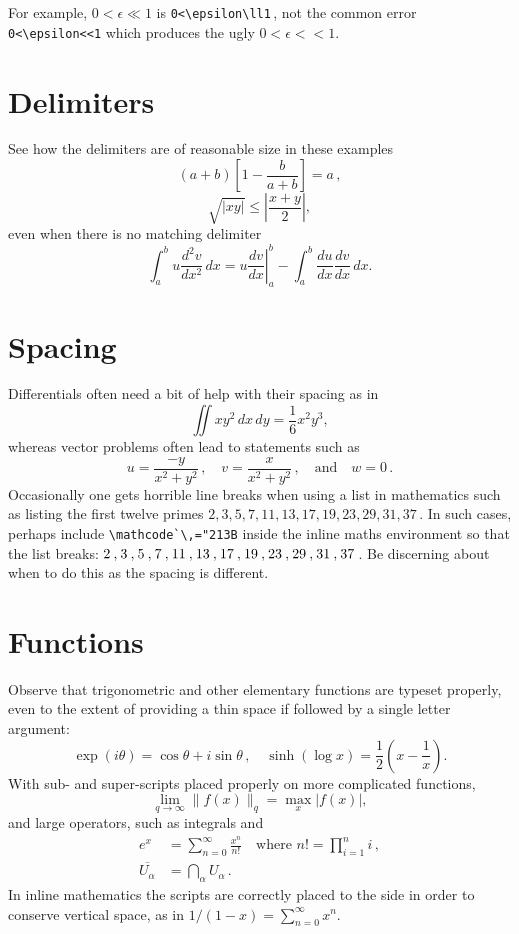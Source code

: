 \documentclass[20pt,a4paper]{extarticle}
\begin{document}
For example, \(0<\epsilon\ll1\) is
\verb|0<\epsilon\ll1|\,, not the common error 
\verb|0<\epsilon<<1| which produces the ugly
\(0<\epsilon<<1\).






\section{Delimiters}

See how the delimiters are of reasonable size in these examples
\[
	\left(a+b\right)\left[1-\frac{b}{a+b}\right]=a\,,
\]
\[
	\sqrt{|xy|}\leq\left|\frac{x+y}{2}\right|,
\]
even when there is no matching delimiter
\[
	\int_a^bu\frac{d^2v}{dx^2}\,dx
	=\left.u\frac{dv}{dx}\right|_a^b
	-\int_a^b\frac{du}{dx}\frac{dv}{dx}\,dx.
\]






\section{Spacing}

Differentials often need a bit of help with their spacing as in
\[
	\iint xy^2\,dx\,dy 
	=\frac{1}{6}x^2y^3,
\]
whereas vector problems often lead to statements such as
\[
	u=\frac{-y}{x^2+y^2}\,,\quad
	v=\frac{x}{x^2+y^2}\,,\quad\text{and}\quad
	w=0\,.
\]
Occasionally one gets horrible line breaks when using a list in mathematics such as listing the first twelve primes  \(2,3,5,7,11,13,17,19,23,29,31,37\)\,.
In such cases, perhaps include \verb|\mathcode`\,="213B| inside the inline maths environment so that the list breaks: \(\mathcode`\,="213B 2,3,5,7,11,13,17,19,23,29,31,37\)\,.
Be discerning about when to do this as the spacing is different.




\section{Functions}

Observe that trigonometric and other elementary functions are typeset 
properly, even to the extent of providing a thin space if followed by 
a single letter argument:
\[
	\exp(i\theta)=\cos\theta +i\sin\theta\,,\quad
	\sinh(\log x)=\frac{1}{2}\left( x-\frac{1}{x} \right).
\]
With sub- and super-scripts placed properly on more complicated 
functions,
\[
	\lim_{q\to\infty}\|f(x)\|_q 
	=\max_{x}|f(x)|,
\]
and large operators, such as integrals and
\begin{align*}
	e^x & =  \sum_{n=0}^\infty \frac{x^n}{n!}
	\quad\text{where }n!=\prod_{i=1}^n i\,,  \\
	\overline{U_\alpha} & =  \bigcap_\alpha U_\alpha\,.
\end{align*}
In inline mathematics the scripts are correctly placed to the side in 
order to conserve vertical space, as in
\(
	1/(1-x)=\sum_{n=0}^\infty x^n.
\)
\end{document}
